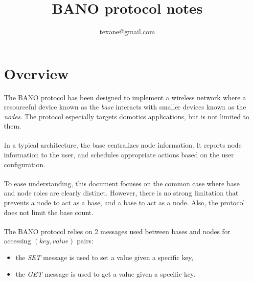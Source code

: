 \documentclass[a4paper, 11pt]{article}
\begin{document}
\title{BANO protocol notes}
\author{texane@gmail.com}
\date{}

\maketitle



\clearpage
\section{Overview}

\paragraph{}
The BANO protocol has been designed to implement a wireless network where a
resourceful device known as the \textit{base} interacts with smaller devices
known as the \textit{nodes}. The protocol especially targets domotics applications,
but is not limited to them.

\paragraph{}
In a typical architecture, the base centralizes node information. It reports
node information to the user, and schedules appropriate actions based on the
user configuration.

\paragraph{}
To ease understanding, this document focuses on the common case where base and
node roles are clearly distinct. However, there is no strong limitation that
prevents a node to act as a base, and a base to act as a node. Also, the protocol
does not limit the base count.

\paragraph{}
The BANO protocol relies on 2 messages used between bases and nodes for accessing
$(key,value)$ pairs:
\begin{itemize}
\item the \textit{SET} message is used to set a value given a specific key,
\item the \textit{GET} message is used to get a value given a specific key.
\end{itemize}
\end{document}
